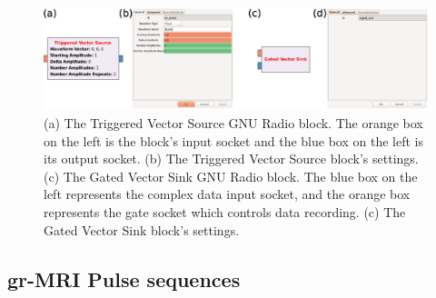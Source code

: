 \documentclass[review]{elsarticle}
\begin{document}
\begin{figure}[!ht]
\begin{center}
\includegraphics[width = \textwidth,trim=0 0 0 0,clip=false]{Fig2_fromChris/Fig2.eps}%
\caption{(a) The Triggered Vector Source GNU Radio block.  
The orange box on the left is the block's input socket and the blue box on the left is its output socket. 
(b) The Triggered Vector Source block's settings.  
(c) The Gated Vector Sink GNU Radio block.  
The blue box on the left represents the complex data input socket, 
and the orange box represents the gate socket which controls data recording. 
(c) The Gated Vector Sink block's settings.}
\label{fig:tvs}
\end{center}
\end{figure}

\subsection{gr-MRI Pulse sequences}
\end{document}
